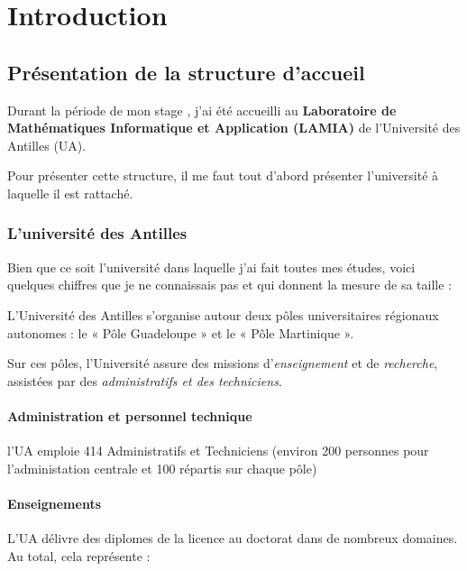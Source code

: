 \hypertarget{Introduction}{%
\chapter{Introduction}\label{Introduction}}

\section{Présentation de la structure
d'accueil}

Durant la période de mon stage , j'ai été accueilli au
\textbf{Laboratoire de Mathématiques Informatique et Application
(LAMIA)} de l'Université des Antilles (UA).

Pour présenter cette structure, il me faut tout d'abord présenter
l'université à laquelle il est rattaché.

\hypertarget{luniversite-des-antilles}{%
\subsection{L'université des Antilles}\label{luniversite-des-antilles}}

Bien que ce soit l'université dans laquelle j'ai fait toutes mes études,
voici quelques chiffres que je ne connaissais pas et qui donnent la
mesure de sa taille :

L'Université des Antilles s'organise autour deux pôles universitaires
régionaux autonomes : le « Pôle Guadeloupe » et le « Pôle Martinique ».

Sur ces pôles, l'Université assure des missions d'\emph{enseignement} et
de \emph{recherche}, assistées par des \emph{administratifs et des
techniciens}.

\hypertarget{administration-et-personnel-technique}{%
\subsubsection{Administration et personnel
technique}
\label{administration-et-personnel-technique}}

l'UA emploie 414 Administratifs et Techniciens (environ 200 personnes
pour l'administation centrale et 100 répartis sur chaque pôle)

\hypertarget{enseignements}{%
\subsubsection{Enseignements}\label{enseignements}}

L'UA délivre des diplomes de la licence au doctorat dans de nombreux
domaines. Au total, cela représente :

